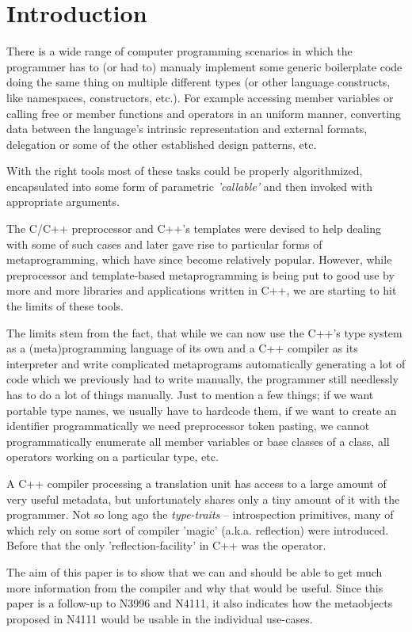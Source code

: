 \section{Introduction}

There is a wide range of computer programming scenarios in which
the programmer has to (or had to) manualy implement some generic boilerplate
code doing the same thing on multiple different types (or other language constructs,
like namespaces, constructors, etc.). For example accessing member variables or
calling free or member functions and operators in an uniform
manner, converting data between the language's intrinsic representation and
external formats, delegation or some of the other
established design patterns, etc.

With the right tools most of these tasks could be properly algorithmized,
encapsulated into some form of parametric {\em 'callable'} and then invoked
with appropriate arguments.

The C/C++ preprocessor and C++'s templates were devised to help dealing
with some of such cases and later gave rise to particular forms of metaprogramming,
which have since become relatively popular. However, while preprocessor and template-based
metaprogramming is being put to good use by more and more libraries and applications written
in C++, we are starting to hit the limits of these tools.

The limits stem from the fact, that while we can now use the C++'s type system
as a (meta)programming language of its own and a C++ compiler as its interpreter
and write complicated metaprograms automatically generating a lot of code
which we previously had to write manually, the programmer still needlessly has to do
a lot of things manually. Just to mention a few things; if we want portable type names,
we usually have to hardcode them, if we want to create an identifier programmatically
we need preprocessor token pasting, we cannot programmatically enumerate all member
variables or base classes of a class, all operators working on a particular type, etc.

A C++ compiler processing a translation unit has access to a large amount
of very useful metadata, but unfortunately shares only a tiny amount of it
with the programmer. Not so long ago the {\em type-traits} -- introspection primitives,
many of which rely on some sort of compiler 'magic' (a.k.a. reflection) were introduced.
Before that the only 'reflection-facility' in C++ was the \verb@typeid@ operator.

The aim of this paper is to show that we can and should be able to get much more
information from the compiler and why that would be useful. Since this paper is a follow-up
to N3996 and N4111, it also indicates how the metaobjects proposed in N4111 would
be usable in the individual use-cases.

